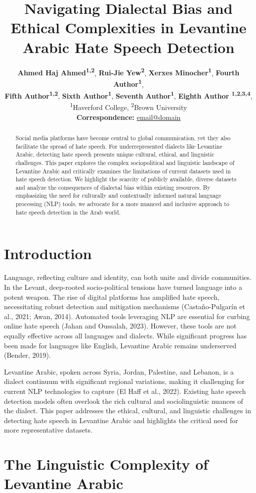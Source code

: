 \documentclass[11pt]{article}
\title{Navigating Dialectal Bias and Ethical Complexities in Levantine Arabic Hate Speech Detection}
\author{
 \textbf{Ahmed Haj Ahmed\textsuperscript{1,2}},
 \textbf{Rui-Jie Yew\textsuperscript{2}},
 \textbf{Xerxes Minocher\textsuperscript{1}},
 \textbf{Fourth Author\textsuperscript{1}},
\\
 \textbf{Fifth Author\textsuperscript{1,2}},
 \textbf{Sixth Author\textsuperscript{1}},
 \textbf{Seventh Author\textsuperscript{1}},
 \textbf{Eighth Author \textsuperscript{1,2,3,4}},
\\
 \textsuperscript{1}Haverford College,
 \textsuperscript{2}Brown University
\\
 \small{
   \textbf{Correspondence:} \href{mailto:email@domain}{email@domain}
 }
}
\begin{document}
\maketitle
\begin{abstract}
Social media platforms have become central to global communication, yet they also facilitate the spread of hate speech. For underrepresented dialects like Levantine Arabic, detecting hate speech presents unique cultural, ethical, and linguistic challenges. This paper explores the complex sociopolitical and linguistic landscape of Levantine Arabic and critically examines the limitations of current datasets used in hate speech detection. We highlight the scarcity of publicly available, diverse datasets and analyze the consequences of dialectal bias within existing resources. By emphasizing the need for culturally and contextually informed natural language processing (NLP) tools, we advocate for a more nuanced and inclusive approach to hate speech detection in the Arab world. 
\end{abstract}


\section{Introduction}

Language, reflecting culture and identity, can both unite and divide communities. In the Levant, deep-rooted socio-political tensions have turned language into a potent weapon. The rise of digital platforms has amplified hate speech, necessitating robust detection and mitigation mechanisms (Castaño-Pulgarín et al., 2021; Awan, 2014). Automated tools leveraging NLP are essential for curbing online hate speech (Jahan and Oussalah, 2023). However, these tools are not equally effective across all languages and dialects. While significant progress has been made for languages like English, Levantine Arabic remains underserved (Bender, 2019).

Levantine Arabic, spoken across Syria, Jordan, Palestine, and Lebanon, is a dialect continuum with significant regional variations, making it challenging for current NLP technologies to capture (El Haff et al., 2022). Existing hate speech detection models often overlook the rich cultural and sociolinguistic nuances of the dialect. This paper addresses the ethical, cultural, and linguistic challenges in detecting hate speech in Levantine Arabic and highlights the critical need for more representative datasets.


\section{The Linguistic Complexity of Levantine Arabic}
\end{document}
